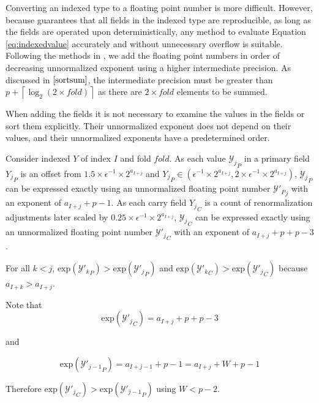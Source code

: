 \documentclass[12pt]{article}
\providecommand{\ceil}[1]{\left \lceil #1 \right \rceil }
\providecommand{\exp}{\ensuremath{\text{exp}}}
\theoremstyle{plain}
\begin{document}
    Converting an indexed type to a floating point number is more difficult. However, because \cite{repsum} guarantees that all fields in the indexed type are reproducible, as long as the fields are operated upon deterministically, any method to evaluate Equation \ref{eq:indexedvalue} accurately and without unnecessary overflow is suitable. Following the methods in \cite{sortsum}, we add the floating point numbers in order of decreasing unnormalized exponent using a higher intermediate precision. As discussed in $\cite{sortsum}$, the intermediate precision must be greater than $p + \ceil{\log_2(2 \times fold)}$ as there are $2 \times fold$ elements to be summed.

    When adding the fields it is not necessary to examine the values in the fields or sort them explicitly. Their unnormalized exponent does not depend on their values, and their unnormalized exponents have a predetermined order.

    Consider indexed $Y$ of index $I$ and fold $fold$.
    As each value ${\mathcal{Y}_j}_P$ in a primary field ${Y_j}_P$ is an offset from $1.5 \times \epsilon^{-1} \times 2^{a_{I + j}}$ and ${Y_j}_P \in (\epsilon^{-1} \times 2^{a_{I + j}}, 2 \times \epsilon^{-1} \times 2^{a_{I + j}})$, ${\mathcal{Y}_j}_P$ can be expressed exactly using an unnormalized floating point number ${\mathcal{Y}'_P}_j$ with an exponent of $a_{I + j} + p - 1$.
    As each carry field ${Y_j}_C$ is a count of renormalization adjustments later scaled by $0.25 \times \epsilon^{-1} \times 2^{a_{I + j}}$, ${\mathcal{Y}_j}_C$ can be expressed exactly using an unnormalized floating point number ${\mathcal{Y}'_j}_C$ with an exponent of $a_{I + j} + p + p - 3$.

    For all $k < j$, $\exp({\mathcal{Y}'_k}_P) > \exp({\mathcal{Y}'_j}_P)$ and $\exp({\mathcal{Y}'_k}_C) > \exp({\mathcal{Y}'_j}_C)$ because $a_{I + k} > a_{I + j}$.

    Note that
    \begin{equation*}
      \exp({\mathcal{Y}'_j}_C) = a_{I + j} + p + p - 3
    \end{equation*}

    and

    \begin{equation*}
      \exp({\mathcal{Y}'_{j - 1}}_P) = a_{I + j - 1} + p - 1 = a_{I + j} + W + p - 1
    \end{equation*}

    Therefore $\exp({\mathcal{Y}'_j}_C) > \exp({\mathcal{Y}'_{j - 1}}_P)$ using $W < p - 2$.
\end{document}
